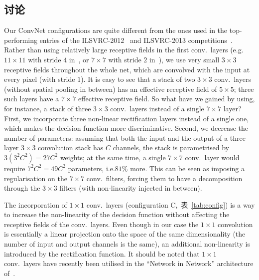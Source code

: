 \documentclass{article} %
\makeatletter
\newcommand{\tblref}[1]{表~\ref{#1}}
\newcommand{\note}[1]{\textbf{NOTE: #1}}
\newcommand*{\eg}{e.g.\@\xspace}
\newcommand*{\ie}{i.e.\@\xspace}
\makeatother
\begin{document}
\subsection{讨论}
\label{sec:discuss}
Our ConvNet configurations are quite different from the ones used in the top-performing entries of the ILSVRC-2012~\citep{Krizhevsky12} and ILSVRC-2013 competitions~\citep{Zeiler13,Sermanet14}.
Rather than using relatively large receptive fields in the first conv.\ layers (\eg $11\times 11$ with stride $4$ in~\citep{Krizhevsky12}, or $7 \times 7$ with stride $2$ in~\citep{Zeiler13,Sermanet14}),
we use very small $3 \times 3$ receptive fields throughout the whole net, which are convolved with the input at every pixel (with stride $1$).
It is easy to see that a stack of two $3 \times 3$ conv.\ layers (without spatial pooling in between) has an effective receptive field of $5 \times 5$;
three such layers have a $7 \times 7$ effective receptive field. 
So what have we gained by using, for instance, a stack of three $3 \times 3$ conv.\ layers instead of a single $7 \times 7$ layer?
First, we incorporate three non-linear rectification layers instead of a single one, which makes the decision function more discriminative.
Second, we decrease the number of parameters: assuming that both the input and the output of a three-layer $3 \times 3$ convolution stack has $C$ channels, the stack is parametrised
by $3 \left( 3^2 C^2 \right) = 27 C^2$ weights; at the same time, a single $7\times 7$ conv.\ layer would require $7^2 C^2=49 C^2$ parameters, \ie $81\%$ more.
This can be seen as imposing a regularisation on the $7\times7$ conv.\ filters, forcing them to have a decomposition through the $3 \times 3$ filters (with non-linearity injected in between).

The incorporation of $1\times 1$ conv.\ layers (configuration C,~\tblref{tab:config}) is a way to increase the non-linearity of the decision function without affecting
the receptive fields of the conv.\ layers. Even though in our case the $1\times 1$ convolution is essentially a linear projection onto the space of the same dimensionality 
(the number of input and output channels is the same), an additional non-linearity is introduced by the rectification function.
It should be noted that $1\times 1$ conv.\ layers have recently been utilised in the ``Network in Network'' architecture of~\citet{Lin14}.
\end{document}
